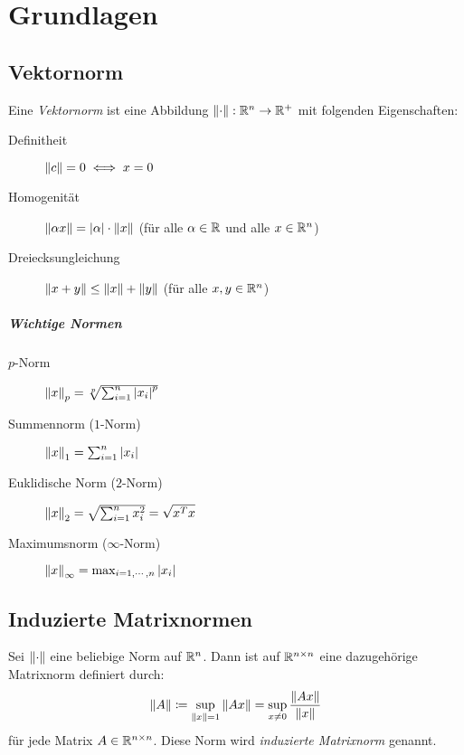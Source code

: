\chapter{Grundlagen}
    \section{Vektornorm}
        Eine \textit{Vektornorm} ist eine Abbildung \( \norm{\cdot} : \mathbb{R}^n \rightarrow \mathbb{R} ^ + \) mit folgenden Eigenschaften:
        \begin{description}
        	\item[Definitheit] \( \norm{c} = 0 \iff x = 0 \)
        	\item[Homogenität] \( \norm{\alpha x} = \abs{\alpha} \cdot \norm{x} \) (für alle \( \alpha \in \mathbb{R} \) und alle \( x \in \mathbb{R}^n \))
        	\item[Dreiecksungleichung] \( \norm{x + y} \leq \norm{x} + \norm{y} \) (für alle \( x, y \in \mathbb{R}^n \))
        \end{description}
    
	    \paragraph{Wichtige Normen}
		    \begin{description}
		    	\item[\(p\)-Norm] \( \norm{x}_p = \sqrt[p]{\sum_{i = 1}^n \abs{x_i}^p} \)
		    	\item[Summennorm (\(1\)-Norm)] \( \norm{x}_1 = \sum_{i = 1}^n \abs{x_i} \)
		    	\item[Euklidische Norm (\(2\)-Norm)] \( \norm{x}_2 = \sqrt{\sum_{i = 1}^n x_i^2} = \sqrt{x^T x} \)
		    	\item[Maximumsnorm (\(\infty\)-Norm)] \( \norm{x}_\infty = \max_{i = 1, \cdots, n} \abs{x_i} \)
		    \end{description}

    \section{Induzierte Matrixnormen}
        Sei \( \norm{\cdot} \) eine beliebige Norm auf \(\mathbb{R}^n\). Dann ist auf \( \mathbb{R}^{n \times n} \) eine dazugehörige Matrixnorm definiert durch:
        \begin{equation*}
	        \norm{A} \coloneqq \sup _ {\norm{x} = 1} \norm{Ax} = \sup _ {x\neq 0} \frac{\norm{Ax}}{\norm{x}}
        \end{equation*}
        für jede Matrix \( A \in \mathbb{R}^{n \times n} \). Diese Norm wird \textit{induzierte Matrixnorm} genannt.
        
